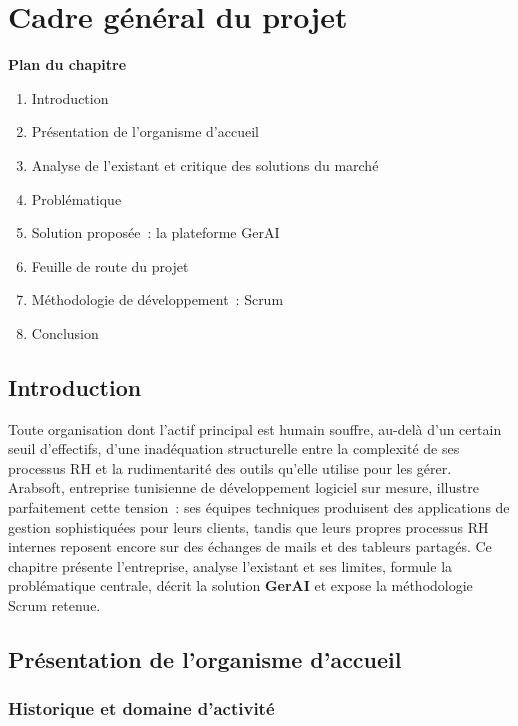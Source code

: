 \chapter{Cadre général du projet}

\noindent\textbf{Plan du chapitre}
\begin{enumerate}[nosep]
  \item Introduction
  \item Présentation de l'organisme d'accueil
  \item Analyse de l'existant et critique des solutions du marché
  \item Problématique
  \item Solution proposée~: la plateforme GerAI
  \item Feuille de route du projet
  \item Méthodologie de développement~: Scrum
  \item Conclusion
\end{enumerate}

\section{Introduction}

Toute organisation dont l'actif principal est humain souffre, au-delà d'un certain
seuil d'effectifs, d'une inadéquation structurelle entre la complexité de ses
processus RH et la rudimentarité des outils qu'elle utilise pour les gérer. Arabsoft,
entreprise tunisienne de développement logiciel sur mesure, illustre parfaitement
cette tension~: ses équipes techniques produisent des applications de gestion
sophistiquées pour leurs clients, tandis que leurs propres processus RH internes
reposent encore sur des échanges de mails et des tableurs partagés. Ce chapitre
présente l'entreprise, analyse l'existant et ses limites, formule la problématique
centrale, décrit la solution \textbf{GerAI} et expose la méthodologie Scrum retenue.

\section{Présentation de l'organisme d'accueil}

\subsection{Historique et domaine d'activité}

